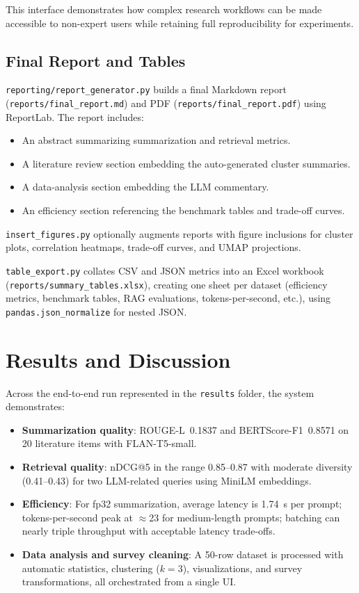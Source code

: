 \documentclass[11pt]{article}
\begin{document}
This interface demonstrates how complex research workflows can be made accessible to non-expert users while retaining full reproducibility for experiments.

\subsection{Final Report and Tables}

\verb|reporting/report_generator.py| builds a final Markdown report (\verb|reports/final_report.md|) and PDF (\verb|reports/final_report.pdf|) using ReportLab. The report includes:

\begin{itemize}[leftmargin=1.5em]
\item An abstract summarizing summarization and retrieval metrics.
\item A literature review section embedding the auto-generated cluster summaries.
\item A data-analysis section embedding the LLM commentary.
\item An efficiency section referencing the benchmark tables and trade-off curves.
\end{itemize}

\verb|insert_figures.py| optionally augments reports with figure inclusions for cluster plots, correlation heatmaps, trade-off curves, and UMAP projections.

\verb|table_export.py| collates CSV and JSON metrics into an Excel workbook (\verb|reports/summary_tables.xlsx|), creating one sheet per dataset (efficiency metrics, benchmark tables, RAG evaluations, tokens-per-second, etc.), using \verb|pandas.json_normalize| for nested JSON.

\section{Results and Discussion}

Across the end-to-end run represented in the \verb|results| folder, the system demonstrates:

\begin{itemize}[leftmargin=1.5em]
\item \textbf{Summarization quality}: ROUGE-L~0.1837 and BERTScore-F1~0.8571 on 20 literature items with FLAN-T5-small.
\item \textbf{Retrieval quality}: nDCG@5 in the range 0.85--0.87 with moderate diversity (0.41--0.43) for two LLM-related queries using MiniLM embeddings.
\item \textbf{Efficiency}: For fp32 summarization, average latency is 1.74~s per prompt; tokens-per-second peak at $\approx$23 for medium-length prompts; batching can nearly triple throughput with acceptable latency trade-offs.
\item \textbf{Data analysis and survey cleaning}: A 50-row dataset is processed with automatic statistics, clustering ($k=3$), visualizations, and survey transformations, all orchestrated from a single UI.
\end{itemize}
\end{document}
